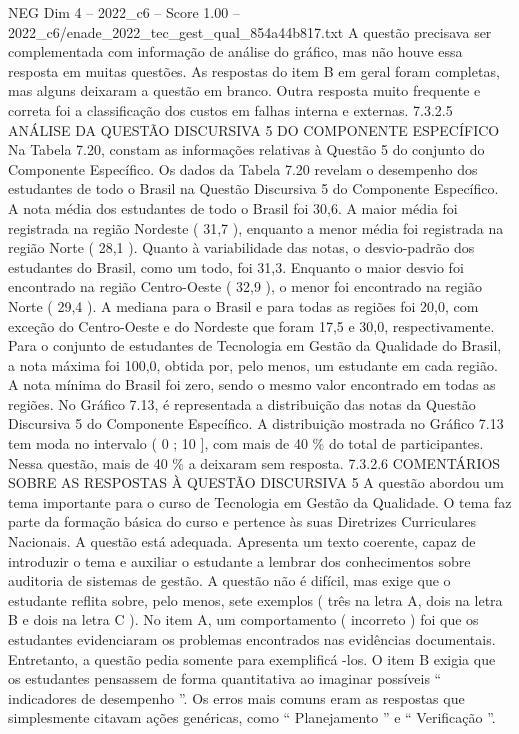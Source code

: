 \begin{textsample}{NEG Dim 4 – 2022\_c6 – Score 1.00 – 2022\_c6/enade\_2022\_tec\_gest\_qual\_854a44b817.txt}
A questão precisava ser complementada com informação de análise do gráfico, mas não houve essa resposta em muitas questões.
As respostas do item B em geral foram completas, mas alguns deixaram a questão em branco.
Outra resposta muito frequente e correta foi a classificação dos custos em falhas interna e externas. 7.3.2.5 ANÁLISE DA QUESTÃO DISCURSIVA 5 DO COMPONENTE ESPECÍFICO Na Tabela 7.20, constam as informações relativas à Questão 5 do conjunto do Componente Específico.
Os dados da Tabela 7.20 revelam o desempenho dos estudantes de todo o Brasil na Questão Discursiva 5 do Componente Específico.
A nota média dos estudantes de todo o Brasil foi 30,6.
A maior média foi registrada na região Nordeste ( 31,7 ), enquanto a menor média foi registrada na região Norte ( 28,1 ).
Quanto à variabilidade das notas, o desvio-padrão dos estudantes do Brasil, como um todo, foi 31,3.
Enquanto o maior desvio foi encontrado na região Centro-Oeste ( 32,9 ), o menor foi encontrado na região Norte ( 29,4 ).
A mediana para o Brasil e para todas as regiões foi 20,0, com exceção do Centro-Oeste e do Nordeste que foram 17,5 e 30,0, respectivamente.
Para o conjunto de estudantes de Tecnologia em Gestão da Qualidade do Brasil, a nota máxima foi 100,0, obtida por, pelo menos, um estudante em cada região.
A nota mínima do Brasil foi zero, sendo o mesmo valor encontrado em todas as regiões.
No Gráfico 7.13, é representada a distribuição das notas da Questão Discursiva 5 do Componente Específico.
A distribuição mostrada no Gráfico 7.13 tem moda no intervalo ( 0 ; 10 ], com mais de 40 \% do total de participantes.
Nessa questão, mais de 40 \% a deixaram sem resposta. 7.3.2.6 COMENTÁRIOS SOBRE AS RESPOSTAS À QUESTÃO DISCURSIVA 5 A questão abordou um tema importante para o curso de Tecnologia em Gestão da Qualidade.
O tema faz parte da formação básica do curso e pertence às suas Diretrizes Curriculares Nacionais.
A questão está adequada.
Apresenta um texto coerente, capaz de introduzir o tema e auxiliar o estudante a lembrar dos conhecimentos sobre auditoria de sistemas de gestão.
A questão não é difícil, mas exige que o estudante reflita sobre, pelo menos, sete exemplos ( três na letra A, dois na letra B e dois na letra C ).
No item A, um comportamento ( incorreto ) foi que os estudantes evidenciaram os problemas encontrados nas evidências documentais.
Entretanto, a questão pedia somente para exemplificá -los.
O item B exigia que os estudantes pensassem de forma quantitativa ao imaginar possíveis “ indicadores de desempenho ”.
Os erros mais comuns eram as respostas que simplesmente citavam ações genéricas, como “ Planejamento ” e “ Verificação ”.

\end{textsample}
